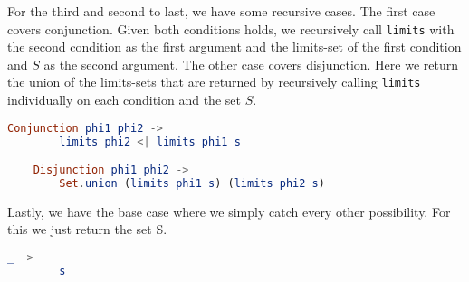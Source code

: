 For the third and second to last, we have some recursive cases. The first case
covers conjunction. Given both conditions holds, we recursively call
\texttt{limits} with the second condition as the first argument and the
limits-set of the first condition and $S$ as the second argument. The other
case covers disjunction. Here we return the union of the limits-sets that are
returned by recursively calling \texttt{limits} individually on each condition
and the set $S$.
\begin{lstlisting}[language=elm,%
    gobble=4,%
    ]
    Conjunction phi1 phi2 ->
        limits phi2 <| limits phi1 s

    Disjunction phi1 phi2 ->
        Set.union (limits phi1 s) (limits phi2 s)
\end{lstlisting}
Lastly, we have the base case where we simply catch every other possibility.
For this we just return the set S.

\begin{lstlisting}[language=elm,%
    gobble=4,%
    ]
    _ ->
        s
\end{lstlisting}

